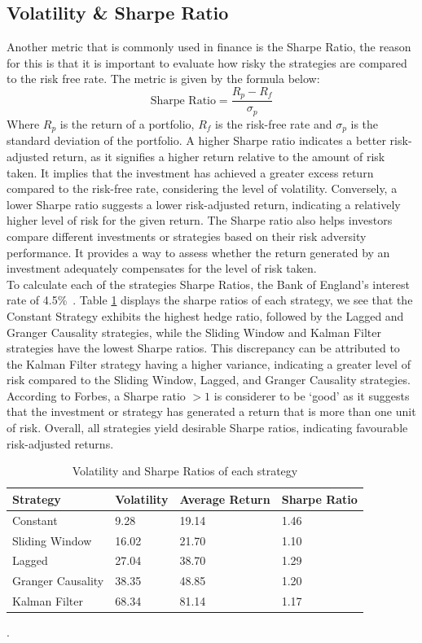 \subsection{Volatility \& Sharpe Ratio}


Another metric that is commonly used in finance is the Sharpe Ratio, the reason for this is that it is important to evaluate how risky the strategies are compared to the risk free rate. The metric is given by the formula below:$$\text{Sharpe Ratio} = \frac{R_p - R_f}{\sigma_p}$$ Where $R_p$ is the return of a portfolio, $R_f$ is the risk-free rate and $\sigma_p$ is the standard deviation of the portfolio. A higher Sharpe ratio indicates a better risk-adjusted return, as it signifies a higher return relative to the amount of risk taken. It implies that the investment has achieved a greater excess return compared to the risk-free rate, considering the level of volatility. Conversely, a lower Sharpe ratio suggests a lower risk-adjusted return, indicating a relatively higher level of risk for the given return. The Sharpe ratio also helps investors compare different investments or strategies based on their risk adversity performance. It provides a way to assess whether the return generated by an investment adequately compensates for the level of risk taken. 
\\[5mm]
To calculate each of the strategies Sharpe Ratios, the Bank of England's interest rate of 4.5\%~\cite{boe_interest}. Table \ref{tab:sharpes} displays the sharpe ratios of each strategy, we see that the Constant Strategy exhibits the highest hedge ratio, followed by the Lagged and Granger Causality strategies, while the Sliding Window and Kalman Filter strategies have the lowest Sharpe ratios. This discrepancy can be attributed to the Kalman Filter strategy having a higher variance, indicating a greater level of risk compared to the Sliding Window, Lagged, and Granger Causality strategies. According to Forbes, a Sharpe ratio $>1$ is considerer to be `good' as it suggests that the investment or strategy has generated a return that is more than one unit of risk. Overall, all strategies yield desirable Sharpe ratios, indicating favourable risk-adjusted returns.

\begin{table}[!htb]
    \centering
        \begin{tabular}{|p{7em}|p{7em}|p{7em}|p{7em}|}\hline
            Strategy & Volatility & Average Return & Sharpe Ratio \\\hline
            Constant & 9.28 & 19.14 & 1.46\\\hline
            Sliding Window & 16.02 & 21.70 & 1.10\\\hline
            Lagged & 27.04 & 38.70 & 1.29 \\\hline
            Granger Causality & 38.35 & 48.85 & 1.20\\\hline
            Kalman Filter & 68.34 & 81.14 & 1.17\\\hline
        \end{tabular}
    \caption{Volatility and Sharpe Ratios of each strategy \label{tab:sharpes}}.
\end{table}

